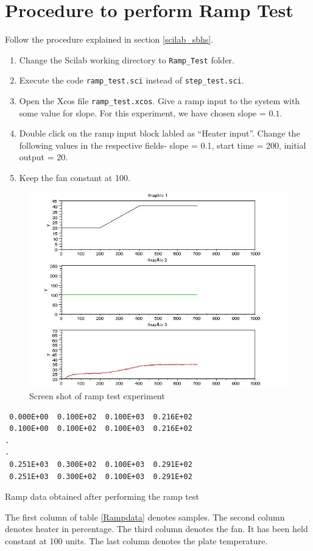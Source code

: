 \section{Procedure to perform Ramp Test}
Follow the procedure explained in section \ref{scilab_sbhs}.
\begin{enumerate}
 \item Change the Scilab working directory to {\tt Ramp\_Test} folder.
 \item Execute the code {\tt ramp\_test.sci} instead of {\tt step\_test.sci}. 
 \item Open the Xcos file {\tt ramp\_test.xcos}. Give a ramp input to the system with some value for slope. For this 
 experiment, we have chosen slope = $0.1$.
 \item Double click on the ramp input block labled as ``Heater input''. Change the following values in the respective 
 fields- slope = 0.1, start time = 200, initial output = 20.
\item Keep the fan constant at 100.
\end{enumerate}
\begin{figure}
\centering
\includegraphics[width=\linewidth]{Ramp-test_manual/ramp_plot.jpg}
\caption{Screen shot of ramp test experiment}
\end{figure}

\begin{table}
\begin{verbatim}
 0.000E+00  0.100E+02  0.100E+03  0.216E+02
 0.100E+00  0.100E+02  0.100E+03  0.216E+02
.
.
 0.251E+03  0.300E+02  0.100E+03  0.291E+02
 0.251E+03  0.300E+02  0.100E+03  0.291E+02
\end{verbatim}
\caption{Ramp data obtained after performing the ramp test}
\label{Rampdata}
\end{table}
The first column of table \ref{Rampdata} denotes samples. 
The second column denotes heater in percentage. The third column denotes the fan. 
It has been held constant at 100 units. The last column denotes the plate temperature.

